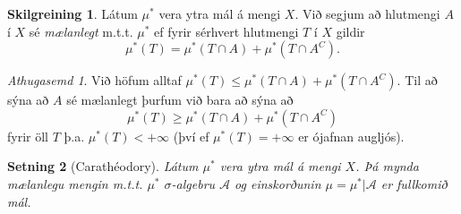 \documentclass[a4paper,icelandic,11pt]{book}
\theoremstyle{plain}      \newtheorem{setn}{Setning}[chapter]
\theoremstyle{definition} \newtheorem{skilgr}[setn]{Skilgreining}
\theoremstyle{remark}     \newtheorem*{ath}{Athugasemd}
\begin{document}
\begin{skilgr}
  Látum $\mu^{*}$ vera ytra mál á mengi $X$. Við segjum að hlutmengi
  $A$ í $X$ sé
  \emph{mælanlegt} m.t.t. $\mu^{*}$ ef fyrir sérhvert
  hlutmengi $T$ í $X$ gildir
  \[
  \mu^{*}(T)
  = \mu^{*}(T\cap A) + \mu^{*}(T\cap A^{C}).
  \]
\end{skilgr}
\begin{ath}
  Við höfum alltaf
  $\mu^{*}(T)\le\mu^{*}(T\cap{A})+\mu^{*}(T\cap{A^{C}})$. Til að sýna
  að $A$ sé mælanlegt þurfum við bara að sýna að
  \[
  \mu^{*}(T) \ge \mu^{*}(T\cap A) + \mu^{*}(T\cap A^{C})
  \]
  fyrir öll $T$ þ.a. $\mu^{*}(T)<+\infty$ (því ef $\mu^{*}(T)=+\infty$
  er ójafnan augljós).
\end{ath}
\begin{setn}
  [Carathéodory]

  Látum $\mu^{*}$ vera ytra mál á mengi $X$. Þá mynda mælanlegu mengin
  m.t.t. $\mu^{*}$ $\sigma$-algebru $\mathcal A$ og einskorðunin
  $\mu=\mu^{*}|\mathcal{A}$ er fullkomið mál.
\end{setn}
\end{document}
